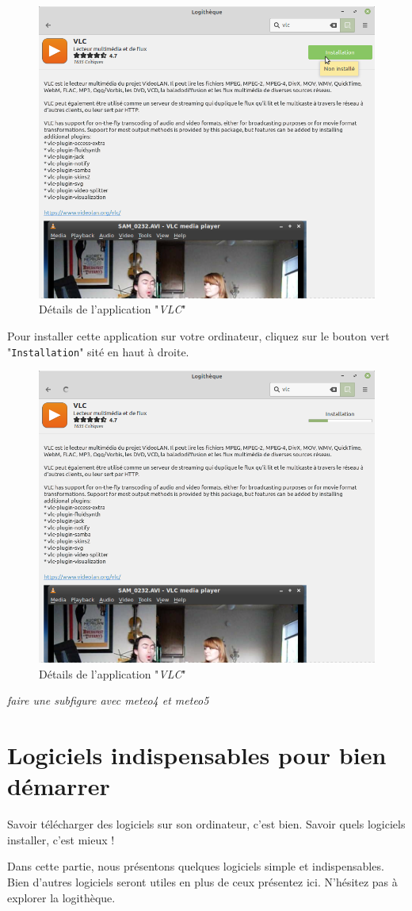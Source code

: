 \documentclass[12pt]{book}
\begin{document}
	\begin{figure}[h]
		\centering
		\includegraphics[width=.8\textwidth]{include/vlc2.png}
		\caption{Détails de l'application "\textit{VLC}"}
		\label{fig:vlc2}
	\end{figure}\par
	Pour installer cette application sur votre ordinateur, cliquez sur le bouton vert "\texttt{Installation}" sité en haut à droite.
	\begin{figure}[h]
		\centering
		\includegraphics[width=.8\textwidth]{include/vlc3.png}
		\caption{Détails de l'application "\textit{VLC}"}
		\label{fig:vlc2}
	\end{figure}
	\textit{faire une subfigure avec meteo4 et meteo5}
\section{Logiciels indispensables pour bien démarrer}
	Savoir télécharger des logiciels sur son ordinateur, c'est bien.
	Savoir quels logiciels installer, c'est mieux !\par
	Dans cette partie, nous présentons quelques logiciels simple et indispensables.
	Bien d'autres logiciels seront utiles en plus de ceux présentez ici.
	N'hésitez pas à explorer la logithèque.
\end{document}
